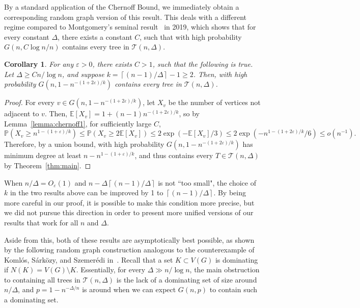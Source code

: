 \documentclass{article}
\theoremstyle{plain}
\newtheorem{theorem}{Theorem}[section]
\newtheorem{corollary}[theorem]{Corollary}
\theoremstyle{definition}
\numberwithin{equation}{section}
\def\eps{\varepsilon}
\newcommand\ceil[1]{\left\lceil#1\right\rceil}
\newcommand\floor[1]{\left\lfloor#1\right\rfloor}
\newcommand\cT{\mathcal{T}}
\begin{document}

By a standard application of the Chernoff Bound, we immediately obtain a corresponding random graph version of this result. This deals with a different regime compared to Montgomery's seminal result~{\cite[Theorem 1.1]{M}} in 2019, which shows that for every constant $\Delta$, there exists a constant $C$, such that with high probability $G(n,C\log n/n)$ contains every tree in $\cT(n,\Delta)$. 
\begin{corollary}\label{cor:random}
For any $\eps>0$, there exists $C>1$, such that the following is true. Let $\Delta\geq Cn/\log n$, and suppose $k=\ceil{(n-1)/\Delta}-1\geq2$. Then, with high probability $G(n,1-n^{-(1+2\eps)/k})$ contains every tree in $\cT(n,\Delta)$. 
\end{corollary}
\begin{proof}%
For every $v\in G(n,1-n^{-(1+2\eps)/k})$, let $X_v$ be the number of vertices not adjacent to $v$. Then, $\mathbb{E}[X_v]=1+(n-1)n^{-(1+2\eps)/k}$, so by Lemma~\ref{lemma:chernoff1}, for sufficiently large $C$,
\[\mathbb{P}(X_v\geq n^{1-(1+\eps)/k})\leq\mathbb{P}(X_v\geq2\mathbb{E}[X_v])\leq2\exp(-\mathbb{E}[X_v]/3)\leq2\exp(-n^{1-(1+2\eps)/k}/6)\leq o(n^{-1}).\]
Therefore, by a union bound, with high probability $G(n,1-n^{-(1+2\eps)/k})$ has minimum degree at least $n-n^{1-(1+\eps)/k}$, and thus contains every $T\in\cT(n,\Delta)$ by Theorem~\ref{thm:main}.
\end{proof}

When $n/\Delta=O_\eps(1)$ and $n-\Delta\ceil{(n-1)/\Delta}$ is not ``too small", the choice of $k$ in the two results above can be improved by 1 to $\ceil{(n-1)/\Delta}$. By being more careful in our proof, it is possible to make this condition more precise, but we did not pursue this direction in order to present more unified versions of our results that work for all $n$ and $\Delta$. 

Aside from this, both of these results are asymptotically best possible, as shown by the following random graph construction analogous to the counterexample of Koml\'os, S\'ark\"ozy, and Szemer\'edi in~\cite{KSS2}. Recall that a set $K\subset V(G)$ is dominating if $N(K)=V(G)\setminus K$. Essentially, for every $\Delta\gg n/\log n$, the main obstruction to containing all trees in $\cT(n,\Delta)$ is the lack of a dominating set of size around $n/\Delta$, and $p=1-n^{-\Delta/n}$ is around when we can expect $G(n,p)$ to contain such a dominating set.
\end{document}
